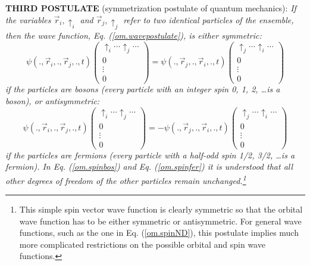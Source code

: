 \documentclass[nofootinbib, secnumarabic, amsmath, nobibnotes,11pt,aps,pra, floatfix]{revtex4-1}
\newcommand{\eref}[1]{Eq. (\ref{#1})}
\begin{document}
\noindent\textbf{THIRD POSTULATE} (symmetrization postulate of quantum mechanics): \textit{If the variables $\vec r_i,\uparrow_i$ and $\vec r_j,\uparrow_j$ refer to two identical particles of the ensemble, then the wave function, \eref{om.wavepostulate}, is either symmetric:
\begin{equation}
\label{om.spinbos}
\psi(.,\vec r_i,.,\vec r_j,.,t)\!\!\left(
\begin{array}{c}
\uparrow_i\ldots \uparrow_j\ldots\\ 0 \\\vdots\\ 0
\end{array}
\right) = \psi(.,\vec r_j,.,\vec r_i,.,t)\left(
\begin{array}{c}
\uparrow_j\ldots \uparrow_i\ldots\\ 0 \\\vdots\\ 0
\end{array}
\right)
\end{equation}
if the particles are bosons (every particle with an integer spin 0, 1, 2, \ldots is a boson), or antisymmetric:
\begin{equation}
\label{om.spinfer} \psi(.,\vec r_i,.,\vec r_j,.,t)\!\!\left(
\begin{array}{c}
\uparrow_i\ldots \uparrow_j\ldots\\ 0 \\\vdots\\ 0
\end{array}
\right)\!\! = -\psi(.,\vec r_j,.,\vec r_i,.,t)\!\!\left(
\begin{array}{c}
\uparrow_j\ldots \uparrow_i\ldots\\ 0 \\ \vdots \\ 0
\end{array}
\right)
\end{equation}
if the particles are fermions (every particle with a half-odd spin 1/2, 3/2, \ldots is a fermion). In \eref{om.spinbos} and \eref{om.spinfer} it is understood that all other degrees of freedom of the other particles remain unchanged.\footnote{This simple spin vector wave function is clearly symmetric so that the orbital wave function has to be either symmetric or antisymmetric. For general wave functions, such as the one in \eref{om.spinND}, this postulate implies much more complicated restrictions on the possible orbital and spin wave functions.}} \\
\end{document}
